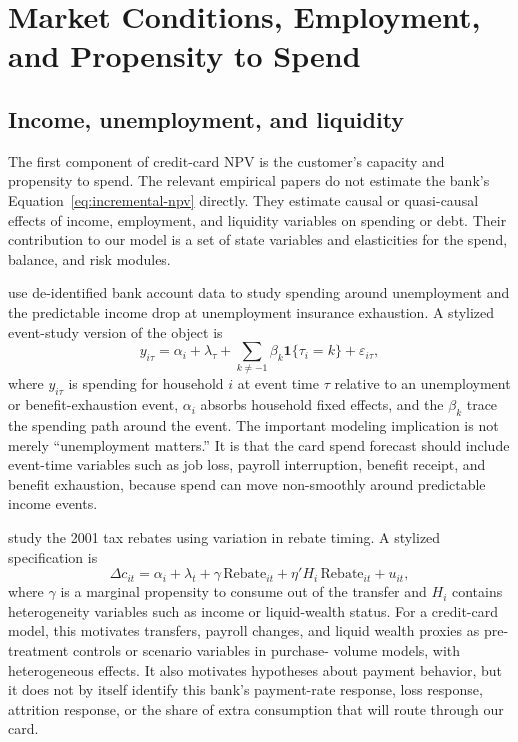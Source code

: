 \documentclass[11pt]{article}
\newcommand{\1}{\mathbf{1}}
\begin{document}
\section{Market Conditions, Employment, and Propensity to Spend}
\label{sec:macro}

\subsection{Income, unemployment, and liquidity}

The first component of credit-card NPV is the customer's capacity and propensity
to spend. The relevant empirical papers do not estimate the bank's
Equation~\eqref{eq:incremental-npv} directly. They estimate causal or
quasi-causal effects of income, employment, and liquidity variables on spending
or debt. Their contribution to our model is a set of state variables and
elasticities for the spend, balance, and risk modules.

\citet{ganong2019unemployment} use de-identified bank account data to study
spending around unemployment and the predictable income drop at unemployment
insurance exhaustion. A stylized event-study version of the object is
\begin{equation}
  y_{i\tau}
  =
  \alpha_i + \lambda_\tau
  + \sum_{k \neq -1} \beta_k \1\{\tau_i = k\}
  + \varepsilon_{i\tau},
  \label{eq:unemployment-event-study}
\end{equation}
where $y_{i\tau}$ is spending for household $i$ at event time $\tau$ relative to
an unemployment or benefit-exhaustion event, $\alpha_i$ absorbs household fixed
effects, and the $\beta_k$ trace the spending path around the event. The
important modeling implication is not merely ``unemployment matters.'' It is
that the card spend forecast should include event-time variables such as job
loss, payroll interruption, benefit receipt, and benefit exhaustion, because
spend can move non-smoothly around predictable income events.

\citet{johnson2004rebates} study the 2001 tax rebates using variation in rebate
timing. A stylized specification is
\begin{equation}
  \Delta c_{it}
  =
  \alpha_i + \lambda_t
  + \gamma\,\mathrm{Rebate}_{it}
  + \eta' H_i\,\mathrm{Rebate}_{it}
  + u_{it},
  \label{eq:rebate-mpc}
\end{equation}
where $\gamma$ is a marginal propensity to consume out of the transfer and
$H_i$ contains heterogeneity variables such as income or liquid-wealth status.
For a credit-card model, this motivates transfers, payroll changes, and liquid
wealth proxies as pre-treatment controls or scenario variables in purchase-
volume models, with heterogeneous effects. It also motivates hypotheses about
payment behavior, but it does not by itself identify this bank's payment-rate
response, loss response, attrition response, or the share of extra consumption
that will route through our card.
\end{document}

